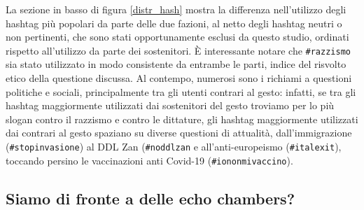     La sezione in basso di figura \ref{distr_hash} mostra la differenza nell'utilizzo degli hashtag più popolari da parte delle due fazioni, al netto degli hashtag neutri o non pertinenti, che sono stati opportunamente esclusi da questo studio, ordinati rispetto all'utilizzo da parte dei sostenitori. È interessante notare che \texttt{\#razzismo} sia stato utilizzato in modo consistente da entrambe le parti, indice del risvolto etico della questione discussa. Al contempo, numerosi sono i richiami a questioni politiche e sociali, principalmente tra gli utenti contrari al gesto: infatti, se tra gli hashtag maggiormente utilizzati dai sostenitori del gesto troviamo per lo più slogan contro il razzismo e contro le dittature, gli hashtag maggiormente utilizzati dai contrari al gesto spaziano su diverse questioni di attualità, dall'immigrazione (\texttt{\#stopinvasione}) al DDL Zan (\texttt{\#noddlzan} e all'anti-europeismo (\texttt{\#italexit}), toccando persino le vaccinazioni anti Covid-19 (\texttt{\#iononmivaccino}).   
    
    \subsection{Siamo di fronte a delle echo chambers?} \label{subsection:echochamb}
    

